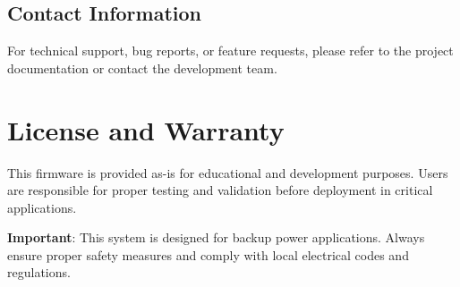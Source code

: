 \documentclass[11pt,a4paper]{article}
\begin{document}
\subsection{Contact Information}
For technical support, bug reports, or feature requests, please refer to the project documentation or contact the development team.

\section{License and Warranty}

This firmware is provided as-is for educational and development purposes. Users are responsible for proper testing and validation before deployment in critical applications.

\textbf{Important}: This system is designed for backup power applications. Always ensure proper safety measures and comply with local electrical codes and regulations.
\end{document}
